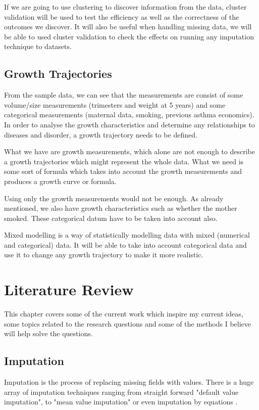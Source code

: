 \documentclass[bsc]{abdnthesis}
\begin{document}
If we are going to use clustering to discover information from the data, cluster validation will be used to test the efficiency as well as the correctness of the outcomes we discover. It will also be useful when handling missing data, we will be able to used cluster validation to check the effects on running any imputation technique to datasets.  
\section{Growth Trajectories} %
\label{sec:growth_trajectories}
From the sample data, we can see that the measurements are consist of some volume/size measurements (trimesters and weight at 5 years) and some categorical measurements (maternal data, smoking, previous asthma economics). In order to analyse the growth characteristics and determine any relationships to diseases and disorder, a growth trajectory needs to be defined. 

What we have are growth measurements, which alone are not enough to describe a growth trajectories which might represent the whole data. What we need is some sort of formula which takes into account the growth measurements and produces a growth curve or formula.

Using only the growth measurements would not be enough. As already mentioned, we also have growth characteristics such as whether the mother smoked. These categorical datum have to be taken into account also. 

Mixed modelling is a way of statistically modelling data with mixed (numerical and categorical) data. It will be able to take into account categorical data and use it to change any growth trajectory to make it more realistic. 


\chapter{Literature Review}
This chapter covers some of the current work which inspire my current ideas, some topics related to the research questions and some of the methods I believe will help solve the questions.
\section{Imputation} %
\label{sec:imputation}
Imputation is the process of replacing missing fields with values. There is a huge array of imputation techniques ranging from straight forward "default value imputation"\cite{ imp-default}, to "mean value imputation" \cite{ imp-mean} or even imputation by equations \cite{imp-mi, imp-mice}. 
\end{document}

